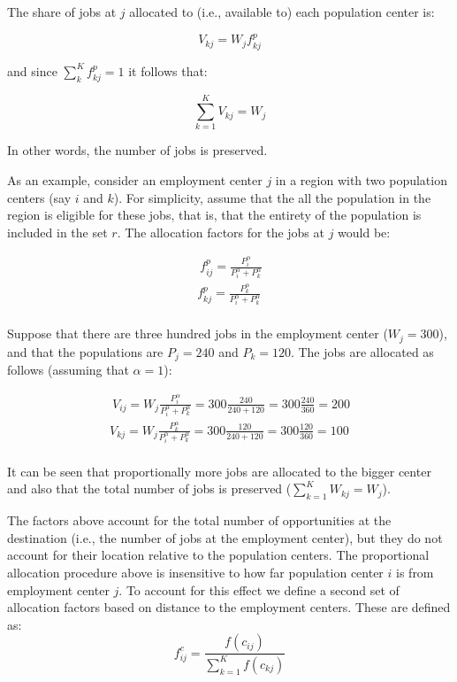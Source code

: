 \documentclass[]{elsarticle} %
\begin{document}
The share of jobs at \(j\) allocated to (i.e., available to) each
population center is:

\[
V_{kj} = W_jf^p_{kj}
\]

\noindent and since \(\sum_k^{K} f^p_{kj} = 1\) it follows that:

\[
\sum_{k=1}^K V_{kj} = W_j 
\]

In other words, the number of jobs is preserved.

As an example, consider an employment center \(j\) in a region with two
population centers (say \(i\) and \(k\)). For simplicity, assume that
the all the population in the region is eligible for these jobs, that
is, that the entirety of the population is included in the set \(r\).
The allocation factors for the jobs at \(j\) would be:

\[
\begin{array}{l}\
f^p_{ij} = \frac{P_i ^\alpha}{P_i^\alpha + P_k^\alpha}\\
f^p_{kj} = \frac{P_k^\alpha}{P_i^\alpha + P_k^\alpha}\\
\end{array}
\]

Suppose that there are three hundred jobs in the employment center
(\(W_j = 300\)), and that the populations are \(P_j=240\) and
\(P_k=120\). The jobs are allocated as follows (assuming that
\(\alpha=1\)):

\[
\begin{array}{l}\
V_{ij} = W_j\frac{P_i^\alpha}{P_i^\alpha + P_k^\alpha} = 300\frac{240}{240 + 120} = 300\frac{240}{360} = 200\\
V_{kj} = W_j\frac{P_k^\alpha}{P_i^\alpha + P_k^\alpha} = 300\frac{120}{240 + 120} = 300\frac{120}{360} = 100 \\
\end{array}
\]

It can be seen that proportionally more jobs are allocated to the bigger
center and also that the total number of jobs is preserved
(\(\sum_{k=1}^K W_{kj} = W_j\)).

The factors above account for the total number of opportunities at the
destination (i.e., the number of jobs at the employment center), but
they do not account for their location relative to the population
centers. The proportional allocation procedure above is insensitive to
how far population center \(i\) is from employment center \(j\). To
account for this effect we define a second set of allocation factors
based on distance to the employment centers. These are defined as: \[
f^c_{ij} = \frac{f(c_{ij})}{\sum_{k=1}^K f(c_{kj})}
\]
\end{document}
